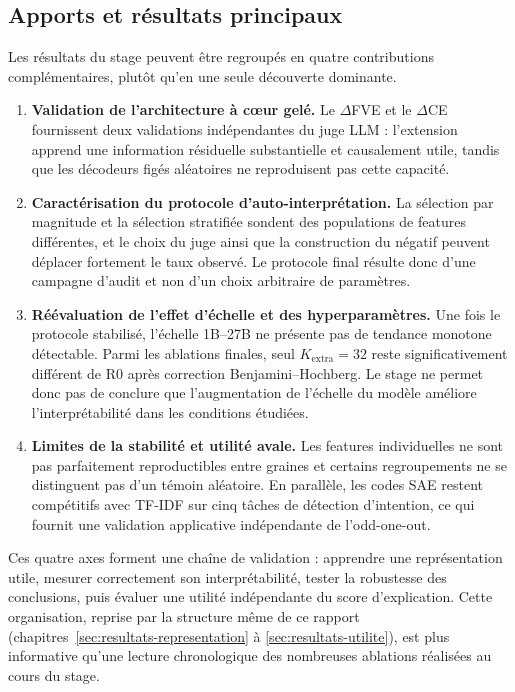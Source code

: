 \documentclass[11pt]{article}
\begin{document}
\subsection{Apports et résultats principaux}

Les résultats du stage peuvent être regroupés en quatre contributions complémentaires,
plutôt qu'en une seule découverte dominante.

\begin{enumerate}
  \item \textbf{Validation de l'architecture à cœur gelé.} Le $\Delta$FVE et le
  $\Delta$CE fournissent deux validations indépendantes du juge LLM : l'extension
  apprend une information résiduelle substantielle et causalement utile, tandis que
  les décodeurs figés aléatoires ne reproduisent pas cette capacité.

  \item \textbf{Caractérisation du protocole d'auto-interprétation.} La sélection par
  magnitude et la sélection stratifiée sondent des populations de features différentes,
  et le choix du juge ainsi que la construction du négatif peuvent déplacer fortement
  le taux observé. Le protocole final résulte donc d'une campagne d'audit et non d'un
  choix arbitraire de paramètres.

  \item \textbf{Réévaluation de l'effet d'échelle et des hyperparamètres.} Une fois le
  protocole stabilisé, l'échelle 1B--27B ne présente pas de tendance monotone détectable.
  Parmi les ablations finales, seul $K_\text{extra}=32$ reste significativement différent
  de R0 après correction Benjamini--Hochberg. Le stage ne permet donc pas de conclure
  que l'augmentation de l'échelle du modèle améliore l'interprétabilité dans les
  conditions étudiées.

  \item \textbf{Limites de la stabilité et utilité avale.} Les features individuelles
  ne sont pas parfaitement reproductibles entre graines et certains regroupements ne
  se distinguent pas d'un témoin aléatoire. En parallèle, les codes SAE restent
  compétitifs avec TF-IDF sur cinq tâches de détection d'intention, ce qui fournit une
  validation applicative indépendante de l'odd-one-out.
\end{enumerate}

Ces quatre axes forment une chaîne de validation : apprendre une représentation utile,
mesurer correctement son interprétabilité, tester la robustesse des conclusions, puis
évaluer une utilité indépendante du score d'explication. Cette organisation, reprise
par la structure même de ce rapport (chapitres~\ref{sec:resultats-representation} à
\ref{sec:resultats-utilite}), est plus informative qu'une lecture chronologique des
nombreuses ablations réalisées au cours du stage.
\end{document}
